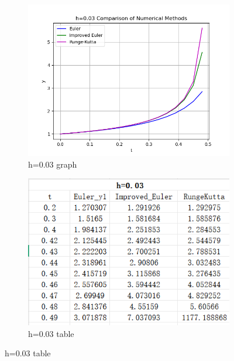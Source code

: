 \documentclass{article}
\begin{document}
\begin{figure}[htb] %
    \centering %

    \begin{subfigure}[b]{0.49\linewidth} %
        \centering
        \includegraphics[width=\linewidth]{pic/comp_0.03_fig.png} %
        \caption{h=0.03 graph} %
        \label{fig:kutta-1} %
    \end{subfigure}
    \hfill %
    \begin{subfigure}[b]{0.45\linewidth}
        \centering
        \includegraphics[width=\linewidth]{pic/comp0.03table.png}
        \caption{h=0.03 table} %
        \label{fig:kutta0} %
    \end{subfigure}
    \hfill %
\end{figure}
\end{document}
